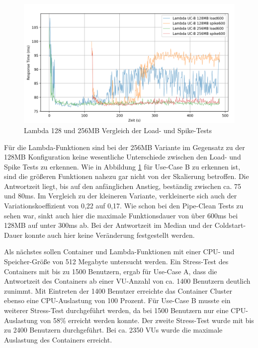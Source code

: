 \begin{figure}[H]
    \includegraphics[width=\textwidth]{img/lambda128+256-ucb-load600-vs-spike600-graph.png}
    \caption[Lambda 128MB und 256MB Vergleich der Load- und Spike-Tests]{Lambda 128 und 256MB Vergleich der Load- und Spike-Tests}
    \label{fig:lambda128+256-ucb-load600-vs-spike600-graph}
\end{figure}

Für die Lambda-Funktionen sind bei der 256MB Variante im Gegensatz zu der 128MB Konfiguration keine wesentliche Unterschiede zwischen den Load- und Spike Tests zu erkennen. Wie in Abbildung \ref{fig:lambda128+256-ucb-load600-vs-spike600-graph} für Use-Case B zu erkennen ist, sind die größeren Funktionen nahezu gar nicht von der Skalierung betroffen. Die Antwortzeit liegt, bis auf den anfänglichen Anstieg, beständig zwischen ca. 75 und 80ms. Im Vergleich zu der kleineren Variante, verkleinerte sich auch der Variationskoeffizient von 0,22 auf 0,17. Wie schon bei den Pipe-Clean Tests zu sehen war, sinkt auch hier die maximale Funktionsdauer von über 600ms bei 128MB auf unter 300ms ab. Bei der Antwortzeit im Median und der Coldstart-Dauer konnte auch hier keine Veränderung festgestellt werden.


Als nächstes sollen Container und Lambda-Funktionen mit einer CPU- und Speicher-Größe von 512 Megabyte untersucht werden. Ein Stress-Test des Containers mit bis zu 1500 Benutzern, ergab für Use-Case A, dass die Antwortzeit des Containers ab einer VU-Anzahl von ca. 1400 Benutzern deutlich zunimmt. Mit Eintreten der 1400 Benutzer erreichte das Container Cluster ebenso eine CPU-Auslastung von 100 Prozent. Für Use-Case B musste ein weiterer Stress-Test durchgeführt werden, da bei 1500 Benutzern nur eine CPU-Auslastung von 58\% erreicht werden konnte. Der zweite Stress-Test wurde mit bis zu 2400 Benutzern durchgeführt. Bei ca. 2350 VUs wurde die maximale Auslastung des Containers erreicht.

